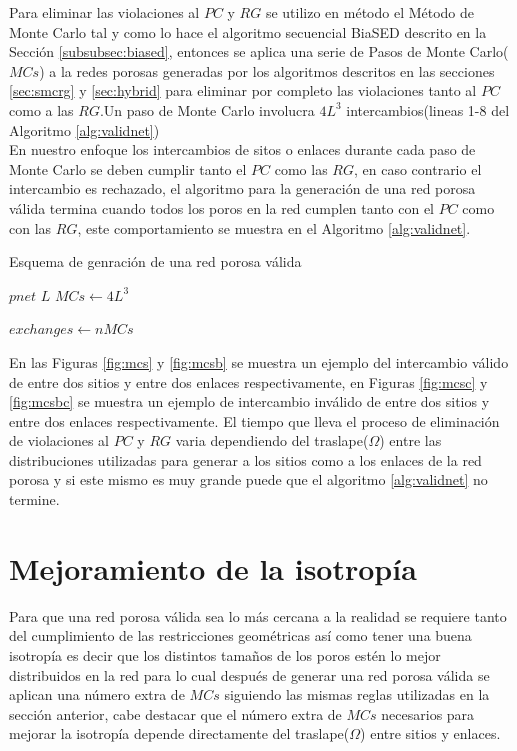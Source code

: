 Para eliminar las violaciones al $PC$ y $RG$ se utilizo en método el Método de Monte Carlo tal y como lo hace el algoritmo secuencial BiaSED descrito en la Sección \ref{subsubsec:biased}, entonces se aplica una serie de Pasos de Monte Carlo($MCs$) a la redes porosas generadas por los algoritmos descritos en las secciones \ref{sec:smcrg} y \ref{sec:hybrid} para eliminar por completo las violaciones tanto al $PC$ como a las $RG$.Un paso de Monte Carlo involucra $4L^3$ intercambios(lineas 1-8 del Algoritmo \ref{alg:validnet})\\

En nuestro enfoque los intercambios de sitos o enlaces durante cada paso de Monte Carlo se deben cumplir tanto el $PC$ como las $RG$, en caso contrario el intercambio es rechazado, el algoritmo para la generación de una red porosa válida termina cuando todos los poros en la red cumplen tanto con el $PC$ como con las $RG$, este comportamiento se muestra en el Algoritmo \ref{alg:validnet}.\\

\begin{algorithm}
\caption{Esquema de genración de una red porosa válida}\label{alg:validnet}
\begin{algorithmic}[1]
\Require $pnet$
\Require $L$
\State $MCs \gets 4L^3$

	\State $exchanges \gets nMCs$
		\State {}
			\State {}
		\EndIf
	\EndWhile
\EndWhile
\end{algorithmic}
\end{algorithm}

En las Figuras \ref{fig:mcs} y \ref{fig:mcsb} se muestra un ejemplo del intercambio válido de entre dos sitios y entre dos enlaces respectivamente, en Figuras \ref{fig:mcsc} y \ref{fig:mcsbc} se muestra un ejemplo de intercambio inválido de entre dos sitios y entre dos enlaces respectivamente. El tiempo que lleva el proceso de eliminación de violaciones al $PC$ y $RG$ varia dependiendo del traslape($\Omega$) entre las distribuciones utilizadas para generar a los sitios como a los enlaces de la red porosa y si este mismo es muy grande puede que el algoritmo \ref{alg:validnet} no termine.


\section{Mejoramiento de la isotropía}
\label{sec:isotropy}
Para que una red porosa válida sea lo más cercana a la realidad se requiere tanto del cumplimiento de las restricciones geométricas así como tener una buena isotropía es decir que los distintos tamaños de los poros estén lo mejor distribuidos en la red para lo cual después de generar una red porosa válida se aplican una número extra de $MCs$ siguiendo las mismas reglas utilizadas en la sección anterior, cabe destacar que el número extra de $MCs$ necesarios para mejorar la isotropía depende directamente del traslape($\Omega$) entre sitios y enlaces.


